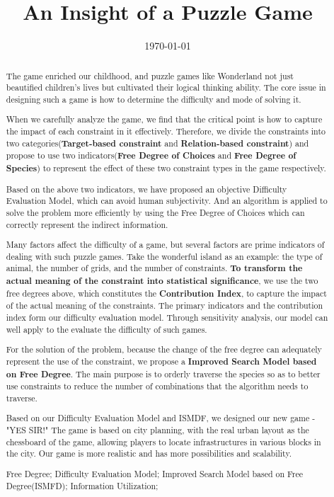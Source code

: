 \documentclass{mcmthesis}
\title{An Insight of a Puzzle Game}
\author{}
\date{\today}
\begin{document}
	\begin{abstract}
		
		The game enriched our childhood, and puzzle games like Wonderland not just beautified children's lives but cultivated their logical thinking ability. The core issue in designing such a game is how to determine the difficulty and mode of solving it.
		
		When we carefully analyze the game, we find that the critical point is how to capture the impact of each constraint in it effectively. Therefore, we divide the constraints into two categories(\textbf{Target-based constraint} and \textbf{Relation-based constraint}) and propose to use two indicators(\textbf{Free Degree of Choices} and \textbf{ Free Degree of Species}) to represent the effect of these two constraint types in the game respectively.
		
		Based on the above two indicators, we have proposed an objective Difficulty Evaluation Model, which can avoid human subjectivity. And an algorithm is applied to solve the problem more efficiently by using the Free Degree of Choices which can correctly represent the indirect information.
		
		Many factors affect the difficulty of a game, but several factors are prime indicators of dealing with such puzzle games. Take the wonderful island as an example: the type of animal, the number of grids, and the number of constraints. \textbf{To transform the actual meaning of the constraint into statistical significance}, we use the two free degrees above, which constitutes the \textbf{Contribution Index}, to capture the impact of the actual meaning of the constraints. The primary indicators and the contribution index form our difficulty evaluation model. Through sensitivity analysis, our model can well apply to the evaluate the difficulty of such games.
		
		For the solution of the problem, because the change of the free degree can adequately represent the use of the constraint, we propose a \textbf{Improved Search Model based on Free Degree}. The main purpose is to orderly traverse the species so as to better use constraints to reduce the number of combinations that the algorithm needs to traverse.
		
		Based on our Difficulty Evaluation Model and ISMDF, we designed our new game - "YES SIR!" The game is based on city planning, with the real urban layout as the chessboard of the game, allowing players to locate infrastructures in various blocks in the city. Our game is more realistic and has more possibilities and scalability.
		
		
		
		
		
		\begin{keywords}
			Free Degree; Difficulty Evaluation Model; Improved Search Model based on Free Degree(ISMFD); Information Utilization;
		\end{keywords}
	\end{abstract}
\end{document}
